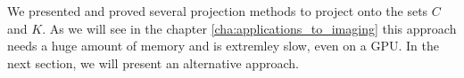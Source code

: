 


We presented and proved several projection methods to project onto the sets $C$ and $K$. As we will see in the chapter \ref{cha:applications_to_imaging} this approach needs a huge amount of memory and is extremley slow, even on a GPU. In the next section, we will present an alternative approach.